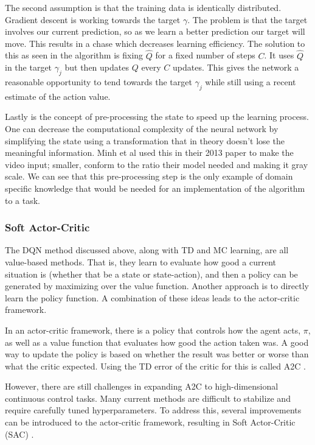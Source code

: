 The second assumption is that the training data is identically distributed. Gradient descent is working towards the target $\gamma$. The problem is that the target involves our current prediction, so as we learn a better prediction our target will move. This results in a chase which decreases learning efficiency. The solution to this as seen in the algorithm is fixing $\hat{Q}$ for a fixed number of steps $C$. It uses $\hat{Q}$ in the target $\gamma_{j}$ but then updates $Q$ every $C$ updates. This gives the network a reasonable opportunity to tend towards the target $\gamma_{j}$ while still using a recent estimate of the action value.

Lastly is the concept of pre-processing the state to speed up the learning process. One can decrease the computational complexity of the neural network by simplifying the state using a transformation that in theory doesn't lose the meaningful information. Minh et al used this in their 2013 paper to make the video input; smaller, conform to the ratio their model needed and making it gray scale. We can see that this pre-processing step is the only example of domain specific knowledge that would be needed for an implementation of the algorithm to a task.

\subsubsection{Soft Actor-Critic}\label{subsec:SAC}

The DQN method discussed above, along with TD and MC learning, are all value-based methods. That is, they learn to evaluate how good a current situation is (whether that be a state or state-action), and then a policy can be generated by maximizing over the value function. Another approach is to directly learn the policy function. A combination of these ideas leads to the actor-critic framework.

In an actor-critic framework, there is a policy that controls how the agent acts, $\pi$, as well as a value function that evaluates how good the action taken was. A good way to update the policy is based on whether the result was better or worse than what the critic expected. Using the TD error of the critic for this is called A2C \cite{mnihAsynchronousMethodsDeep2016}.

However, there are still challenges in expanding A2C to high-dimensional continuous control tasks. Many current methods are difficult to stabilize and require carefully tuned hyperparameters. To address this, several improvements can be introduced to the actor-critic framework, resulting in Soft Actor-Critic (SAC) \cite{haarnojaSoftActorCriticOffPolicy2018}.


